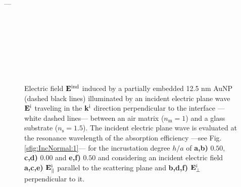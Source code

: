 ---
\begin{figure}[t!]\centering
   \def\svgwidth{.75\textwidth}
   \footnotesize
   \\[-47.5em]
   \hspace*{-.25\textwidth}
       \begin{subfigure}{.25\textwidth}\textcolor{red}{\caption{ } \label{sfig:Near:IncNorm:50:par}}\end{subfigure}%
       \begin{subfigure}{.34\textwidth}\caption{ }\label{sfig:Near:IncNorm:50:perp}\end{subfigure}\\[13em]
    \hspace*{-.25\textwidth}
        \begin{subfigure}{.25\textwidth}\textcolor{red}{\caption{ }\label{sfig:Near:IncNorm:00:par}}\end{subfigure}%
        \begin{subfigure}{.34\textwidth}\caption{ }\label{sfig:Near:IncNorm:00:perp}\end{subfigure}\\[13em]
   \hspace*{-.25\textwidth}
       \begin{subfigure}{.25\textwidth}\caption{ } \label{sfig:Near:IncNorm:-5:par}\end{subfigure}%
       \begin{subfigure}{.34\textwidth}\caption{ }\label{sfig:Near:IncNorm:-5:perp}\end{subfigure}\\[15em]
   \caption[Induced Electric Field of a 12.5 nm Au Spherical NP embbeded into (supported on) a substrate illuminated at a normal incidence]{
       Electric field $\vb{E}^\text{ind}$ induced by a partially embedded 12.5 nm AuNP (dashed black lines) illuminated by an incident electric plane wave $\vb{E}^\text{i}$ traveling in the $\vb{k}^\text{i}$ direction perpendicular to the interface ---white dashed lines--- between an air matrix ($n_\text{m} = 1$) and a glass substrate ($n_\text{s} = 1.5$). The incident electric plane wave is evaluated at the resonance wavelength of the absorption efficiency ---see Fig. \ref{sfig:IncNormal:1}--- for the incrustation degree $h/a$ of \textbf{a,b)} $0.50$, \textbf{c,d)} $0.00$ and \textbf{e,f)} $0.50$ and considering an incident electric field \textbf{a,c,e)} $\vb{E}^\text{i}_\parallel$ parallel to the scattering plane and \textbf{b,d,f)} $\vb{E}^\text{i}_\perp$ perpendicular to it.
   }
   \label{fig:Near:IncNorm}
 \end{figure}
